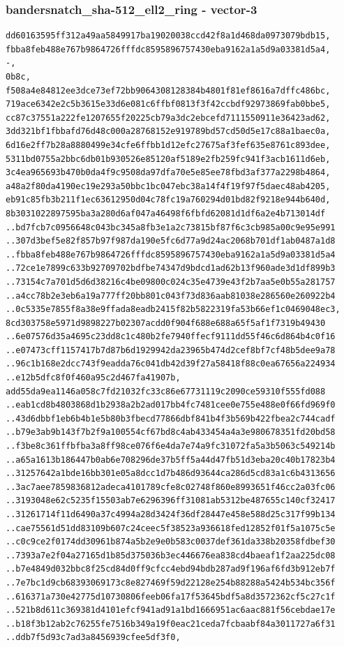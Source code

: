 \documentclass[
]{article}
\begin{document}
\subsubsection{bandersnatch\_sha-512\_ell2\_ring -
vector-3}\label{bandersnatch_sha-512_ell2_ring---vector-3}

\begin{verbatim}
dd60163595ff312a49aa5849917ba19020038ccd42f8a1d468da0973079bdb15,
fbba8feb488e767b9864726fffdc8595896757430eba9162a1a5d9a03381d5a4,
-,
0b8c,
f508a4e84812ee3dce73ef72bb9064308128384b4801f81ef8616a7dffc486bc,
719ace6342e2c5b3615e33d6e081c6ffbf0813f3f42ccbdf92973869fab0bbe5,
cc87c37551a222fe1207655f20225cb79a3dc2ebcefd7111550911e36423ad62,
3dd321bf1fbbafd76d48c000a28768152e919789bd57cd50d5e17c88a1baec0a,
6d16e2ff7b28a8880499e34cfe6ffbb1d12efc27675af3fef635e8761c893dee,
5311bd0755a2bbc6db01b930526e85120af5189e2fb259fc941f3acb1611d6eb,
3c4ea965693b470b0da4f9c9508da97dfa70e5e85ee78fbd3af377a2298b4864,
a48a2f80da4190ec19e293a50bbc1bc047ebc38a14f4f19f97f5daec48ab4205,
eb91c85fb3b211f1ec63612950d04c78fc19a760294d01bd82f9218e944b640d,
8b3031022897595ba3a280d6af047a46498f6fbfd62081d1df6a2e4b713014df
..bd7fcb7c0956648c043bc345a8fb3e1a2c73815bf87f6c3cb985a00c9e95e991
..307d3bef5e82f857b97f987da190e5fc6d77a9d24ac2068b701df1ab0487a1d8
..fbba8feb488e767b9864726fffdc8595896757430eba9162a1a5d9a03381d5a4
..72ce1e7899c633b92709702bdfbe74347d9bdcd1ad62b13f960ade3d1df899b3
..73154c7a701d5d6d38216c4be09800c024c35e4739e43f2b7aa5e0b55a281757
..a4cc78b2e3eb6a19a777ff20bb801c043f73d836aab81038e286560e260922b4
..0c5335e7855f8a38e9ffada8eadb2415f82b5822319fa53b66ef1c0469048ec3,
8cd303758e5971d9898227b02307acdd0f904f688e688a65f5af1f7319b49430
..6e07576d35a4695c23dd8c1c480b2fe7940ffecf9111dd55f46c6d864b4c0f16
..e07473cff1157417b7d87b6d1929942da23965b474d2cef8bf7cf48b5dee9a78
..96c1b168e2dcc743f9eadda76c041db42d39f27a58418f88c0ea67656a224934
..e12b5dfc8f0f460a95c2d467fa41907b,
add55da9ea1146a058c7fd21032fc33c86e67731119c2090ce59310f555fd088
..eab1cd8b4803868d1b2938a2b2ad017bb4fc7481cee0e755e488e0f66fd969f0
..43d6dbbf1eb6b4b1e5b80b3fbecd77866dbf841b4f3b569b422fbea2c744cadf
..b79e3ab9b143f7b2f9a100554cf67bd8c4ab433454a4a3e980678351fd20bd58
..f3be8c361ffbfba3a8ff98ce076f6e4da7e74a9fc31072fa5a3b5063c549214b
..a65a1613b186447b0ab6e708296de37b5ff5a44d47fb51d3eba20c40b17823b4
..31257642a1bde16bb301e05a8dcc1d7b486d93644ca286d5cd83a1c6b4313656
..3ac7aee7859836812adeca4101789cfe8c02748f860e8993651f46cc2a03fc06
..3193048e62c5235f15503ab7e6296396ff31081ab5312be487655c140cf32417
..31261714f11d6490a37c4994a28d3424f36df28447e458e588d25c317f99b134
..cae75561d51dd83109b607c24ceec5f38523a936618fed12852f01f5a1075c5e
..c0c9ce2f0174dd30961b874a5b2e9e0b583c0037def361da338b20358fdbef30
..7393a7e2f04a27165d1b85d375036b3ec446676ea838cd4baeaf1f2aa225dc08
..b7e4849d032bbc8f25cd84d0ff9cfcc4ebd94bdb287ad9f196af6fd3b912eb7f
..7e7bc1d9cb68393069173c8e827469f59d22128e254b88288a5424b534bc356f
..616371a730e42775d10730806feeb06fa17f53645bdf5a8d3572362cf5c27c1f
..521b8d611c369381d4101efcf941ad91a1bd1666951ac6aac881f56cebdae17e
..b18f3b12ab2c76255fe7516b349a19f0eac21ceda7fcbaabf84a3011727a6f31
..ddb7f5d93c7ad3a8456939cfee5df3f0,
\end{verbatim}
\end{document}
